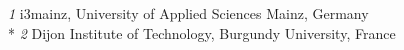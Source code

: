 \textit{1}  i3mainz, University of Applied Sciences Mainz, Germany    \\*                                                                     
\textit{2}  Dijon Institute of Technology, Burgundy University, France